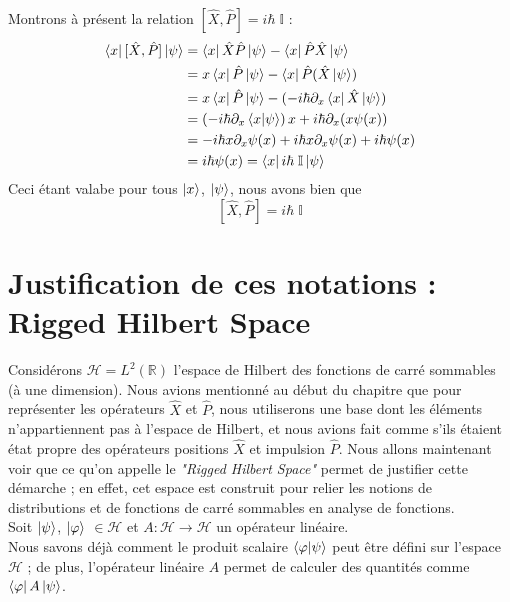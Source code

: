 \documentclass[../notesdecours]{subfiles}
\begin{document}
Montrons à présent la relation $[\hat{X}, \hat{P}] = i\hbar \; \mathbb{I}$ : 
\begin{align}
    \bra{x}[\hat{X}, \hat{P}] \ket{\psi} &= \bra{x} \hat{X}\hat{P}\ket{\psi} - \bra{x} \hat{P}\hat{X}\ket{\psi} \notag \\
    &= x \bra{x}\hat{P}\ket{\psi} - \bra{x}\hat{P}(\hat{X}\ket{\psi})\notag \\
	&= x \bra{x}\hat{P}\ket{\psi} - ( -i\hbar \partial_x \bra{x}\hat{X}\ket{\psi} ) \notag \\
    &= \left( -i\hbar \partial_x \braket{x|\psi} \right) x + i\hbar \partial_x (x \psi(x)) \notag \\
    &= -i\hbar x \partial_x \psi(x) + i\hbar x\partial_x \psi(x) + i\hbar \psi(x) \notag \\
    &= i\hbar \psi(x) = \bra{x} i\hbar \; \mathbb{I}\ket{\psi} 
\end{align}
Ceci étant valabe pour tous $\ket{x}$, $\ket{\psi}$, nous avons bien que 
\begin{equation}\label{eq:chap6-commut_X_P}
     [\hat{X}, \hat{P}] = i\hbar \; \mathbb{I}
\end{equation} 

\section{Justification de ces notations : Rigged Hilbert Space}
Considérons $\mathcal{H} = L^2(\mathbb{R})$ l'espace de Hilbert des fonctions de carré sommables (à une dimension). Nous avions mentionné au début du chapitre que pour représenter les opérateurs $\hat{X}$ et $\hat{P}$, nous utiliserons une base dont les éléments n'appartiennent pas à l'espace de Hilbert, et nous avions fait comme s'ils étaient état propre des opérateurs positions $\hat{X}$ et impulsion $\hat{P}$. Nous allons maintenant voir que ce qu'on appelle le \textit{"Rigged Hilbert Space"} permet de justifier cette démarche ; en effet, cet espace est construit pour relier les notions de distributions et de fonctions de carré sommables en analyse de fonctions. \\

Soit $\ket{\psi}$, $\ket{\varphi}$ $\in \mathcal{H}$ et $A : \mathcal{H} \rightarrow \mathcal{H}$ un opérateur linéaire. \\
Nous savons déjà comment le produit scalaire $\braket{\varphi | \psi}$ peut être défini sur l'espace $\mathcal{H}$ ; de plus, l'opérateur linéaire $A$ permet de calculer des quantités comme $\bra{\varphi} A \ket{\psi}$. \\
\end{document}
